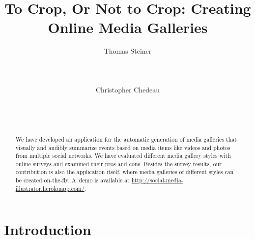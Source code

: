 \documentclass{sig-alternate}
\newcommand{\inlinelistingsize}{\fontsize{8pt}{11pt}}
\let\oldurl\url
\renewcommand{\url}[1]{\inlinelistingsize\oldurl{#1}}
\begin{document}


\title{To Crop, Or Not to Crop: Creating Online Media Galleries}

\author{
\alignauthor
Thomas Steiner\\
	\\
	\\
	\\
\alignauthor
Christopher Chedeau\\
	\\
	\\
	\\
}
\maketitle

\begin{abstract}
We have developed an application for the automatic generation of
media galleries that visually and audibly summarize events
based on media items like videos and photos from multiple social networks.
We have evaluated different media gallery styles with online surveys 
and examined their pros and cons.
Besides the survey results, our contribution is also the application itself,
where media galleries of different styles can be created on-the-fly.
A~demo is available at
\url{http://social-media-illustrator.herokuapp.com/}.
\end{abstract}

\vspace{-1mm}

\vspace{-2mm}

\vspace{-2mm}

\section{Introduction}
\end{document}
